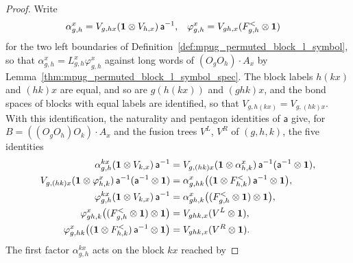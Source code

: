 \begin{proof}\leanok
    Write
    \begin{align}
        \alpha^x_{g,h}  & =V_{g,hx}(\mathbf 1\otimes V_{h,x})\,\mathsf a^{-1}, &
        \varphi^x_{g,h} & =V_{gh,x}(F^<_{g,h}\otimes\mathbf 1)
        \notag
    \end{align}
    for the two left boundaries of Definition~\ref{def:mpug_permuted_block_l_symbol},
    so that $\alpha^x_{g,h}=L^x_{g,h}\varphi^x_{g,h}$ against long words of
    $(O_gO_h)\cdot A_x$ by Lemma~\ref{thm:mpug_permuted_block_l_symbol_spec}.
    The block labels $h(kx)$ and $(hk)x$ are equal, and so are $g(h(kx))$ and
    $(ghk)x$, and the bond spaces of blocks with equal labels are identified,
    so that $V_{g,h(kx)}=V_{g,(hk)x}$. With this identification, the
    naturality and
    pentagon identities of $\mathsf a$ give, for $B=((O_gO_h)O_k)\cdot A_x$
    and the fusion trees $V^L$, $V^R$ of $(g,h,k)$, the five identities
    \begin{align}
        \alpha^{kx}_{g,h}(\mathbf 1\otimes V_{k,x})\,\mathsf a^{-1}
         & =V_{g,(hk)x}(\mathbf 1\otimes\alpha^x_{h,k})\,\mathsf a^{-1}
        (\mathsf a^{-1}\otimes\mathbf 1),
        \label{eq:mpug_permuted_l_compat_first_boundary}                \\
        V_{g,(hk)x}(\mathbf 1\otimes\varphi^x_{h,k})\,\mathsf a^{-1}
        (\mathsf a^{-1}\otimes\mathbf 1)
         & =\alpha^x_{g,hk}
        \bigl((\mathbf 1\otimes F^<_{h,k})\,\mathsf a^{-1}\otimes\mathbf 1\bigr),
        \notag                                                          \\
        \varphi^{kx}_{g,h}(\mathbf 1\otimes V_{k,x})\,\mathsf a^{-1}
         & =\alpha^x_{gh,k}
        \bigl((F^<_{g,h}\otimes\mathbf 1)\otimes\mathbf 1\bigr),
        \notag                                                          \\
        \varphi^x_{gh,k}\bigl((F^<_{g,h}\otimes\mathbf 1)\otimes\mathbf 1\bigr)
         & =V_{ghk,x}(V^L\otimes\mathbf 1),
        \notag                                                          \\
        \varphi^x_{g,hk}
        \bigl((\mathbf 1\otimes F^<_{h,k})\,\mathsf a^{-1}\otimes\mathbf 1\bigr)
         & =V_{ghk,x}(V^R\otimes\mathbf 1).
        \notag
    \end{align}
    The first factor $\alpha^{kx}_{g,h}$ acts on the block $kx$ reached by

\end{proof}
